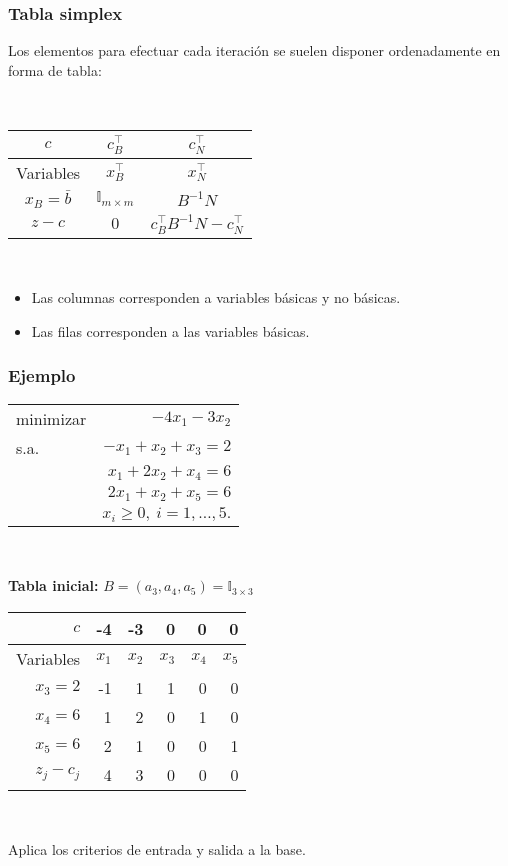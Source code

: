 \documentclass{beamer}
\begin{document}
\begin{frame}
\frametitle{Tabla simplex}

Los elementos para efectuar cada iteración se suelen disponer ordenadamente en forma de tabla:

\

\begin{center}
\begin{tabular}{c|c|c}
$c$ & $c_B^\top$  & $c^\top_N$ \\ \hline
Variables & $x_B^\top$ &  $x^\top_N$ \\ \hline
$x_B=\bar{b}$ &    $\mathbb{I}_{m\times m}$ & $B^{-1}N$ \\ \hline
$z-c$   & $0$   & $c_B^\top B^{-1}N - c^\top_N$
\end{tabular}
\end{center}

\

\begin{itemize}
\item Las columnas corresponden a variables básicas y no básicas.

\item Las filas corresponden a las variables básicas.

\end{itemize}


\end{frame}
\begin{frame}
\frametitle{Ejemplo}

\begin{center}
\begin{tabular}{lr}
minimizar & $-4x_1 - 3x_2$ \\
s.a. & $-x_1+x_2+x_3  = 2$    \\
	 & $x_1 + 2x_2 + x_4 = 6$  \\
	 & $2x_1+x_2 + x_5 = 6$ \\
	 & $x_i\geq 0,\ i=1,\ldots,5.$
\end{tabular}
\end{center}

\

\textbf{Tabla inicial:}  $B=(a_3,a_4,a_5) = \mathbb{I}_{3\times 3}$



\begin{center}
\begin{tabular}{r | rrrrr}
$c$ & -4 & -3 & 0 & 0 & 0 \\ \hline
Variables & $x_1$ & $x_2$ & $x_3$ & $x_4$ & $x_5$ \\ \hline
$x_3 = 2$ & -1 & 1 & 1 & 0 & 0 \\
$x_4=6$   & 1 & 2 & 0 & 1 & 0  \\
$x_5=6$ & 2 & 1 & 0 & 0 & 1 \\ \hline
$z_j-c_j$ & 4 & 3 & 0 & 0 & 0 
\end{tabular}
\end{center}

\

Aplica los criterios de entrada y salida a la base.

\end{frame}
\end{document}
